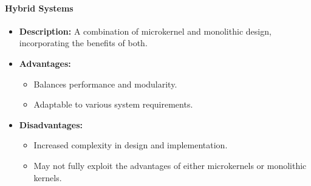 \paragraph{Hybrid Systems}
\begin{itemize}
    \item \textbf{Description:} A combination of microkernel and monolithic design, incorporating the benefits of both.
    \item \textbf{Advantages:}
    \begin{itemize}
        \item Balances performance and modularity.
        \item Adaptable to various system requirements.
    \end{itemize}
    \item \textbf{Disadvantages:}
    \begin{itemize}
        \item Increased complexity in design and implementation.
        \item May not fully exploit the advantages of either microkernels or monolithic kernels.
    \end{itemize}
\end{itemize}